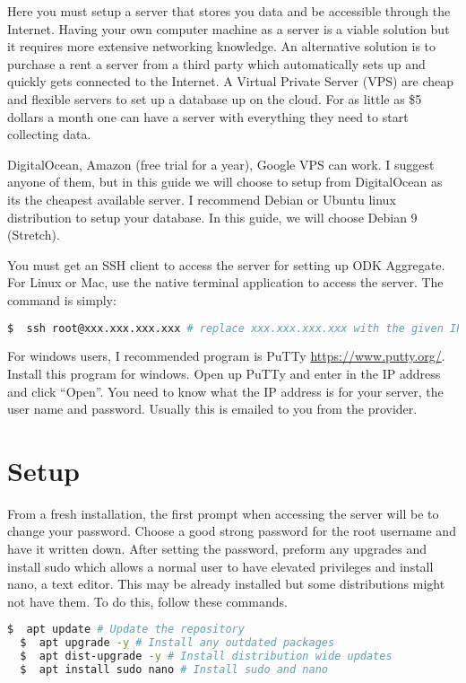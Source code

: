 \indent Here you must setup a server that stores you data and be accessible through the Internet. Having your own computer machine as a server is a viable solution but it requires more extensive networking knowledge. An alternative solution is to purchase a rent a server from a third party which automatically sets up and quickly gets connected to the Internet. A Virtual Private Server (VPS) are cheap and flexible servers to set up a database up on the cloud. For as little as \$5 dollars a month one can have a server with everything they need to start collecting data.

DigitalOcean, Amazon (free trial for a year), Google VPS can work. I suggest anyone of them, but in this guide we will choose to setup from DigitalOcean as its the cheapest available server. I recommend Debian or Ubuntu linux distribution to setup your database. In this guide, we will choose Debian 9 (Stretch).


\noindent
You must get an SSH client to access the server for setting up ODK Aggregate. For Linux or Mac, use the native terminal application to access the server. The command is simply:

\begin{lstlisting}[language=bash]
  $  ssh root@xxx.xxx.xxx.xxx # replace xxx.xxx.xxx.xxx with the given IP address sent by the provider.
\end{lstlisting}


\noindent
For windows users, I recommended program is PuTTy \url{https://www.putty.org/}. Install this program for windows. Open up PuTTy and enter in the IP address and click ``Open''. You need to know what the IP address is for your server, the user name and password. Usually this is emailed to you from the provider.



\section*{Setup}

\noindent
From a fresh installation, the first prompt when accessing the server will be to change your password. Choose a good strong password for the root username and have it written down.  After setting the password, preform any upgrades and install sudo which allows a normal user to have elevated privileges and install nano, a text editor. This may be already installed but some distributions might not have them. To do this, follow these commands.

\begin{lstlisting}[language=bash]
  $  apt update # Update the repository
  $  apt upgrade -y # Install any outdated packages
  $  apt dist-upgrade -y # Install distribution wide updates
  $  apt install sudo nano # Install sudo and nano
\end{lstlisting}

